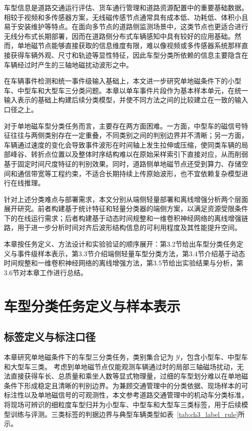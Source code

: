\documentclass{xdupgthesis}
\begin{document}
车型信息是道路交通运行评估、货车通行管理和道路资源配置中的重要基础数据。相较于视频和多传感器方案，无线磁传感节点通常具有成本低、功耗低、体积小且易于安装维护等特点\cite{ch2_sifuentes2011wakeup}。在面向多节点的道路侧监测场景中，这类节点也更适合进行无线分布式长期部署\cite{R09}，因而在道路侧分布式车辆感知中具有较好的应用基础。然而，单地磁节点能够直接获取的信息维度有限，难以像视频或多传感器系统那样直接获得车辆外观、尺寸和轨迹等显性特征，因此车型分类所依赖的信息主要隐含在车辆经过时产生的三轴地磁扰动波形之中。

在车辆事件检测和统一事件级输入基础上，本文进一步研究单地磁条件下的小型车、中型车和大型车三分类问题。本章以单车事件片段作为基本样本单元，在统一输入表示的基础上构建后续分类模型，并使不同方法之间的比较建立在一致的输入口径之上。

对于单地磁车型分类任务而言，主要存在两方面困难。一方面，中型车的磁信号特征往往与两侧类别存在一定重叠，不同类别之间的判别边界并不清晰；另一方面，车辆通过速度的变化会导致事件波形在时间轴上发生拉伸或压缩，使同类车辆的局部峰谷、转折点位置以及整体时序结构难以在原始采样索引下直接对应，从而削弱基于固定时间尺度特征的判别效果。同时，道路侧单地磁节点还受到算力、存储空间和通信带宽等工程约束，不适合长期持续上传原始波形，也不宜依赖复杂模型进行在线推理。

针对上述分类难点与部署需求，本文分别从端侧轻量部署和离线增强分析两个层面展开研究。前者构建基于统计特征和轻量分类器的端侧方案，以满足资源受限条件下的在线运行需求；后者构建基于动态时间规整和一维卷积神经网络的离线增强链路，用于进一步分析时间对齐后波形结构信息的可利用程度及其性能提升空间。

本章按任务定义、方法设计和实验验证的顺序展开：第3.2节给出车型分类任务定义与事件级样本表示，第3.3节介绍端侧轻量车型分类方法，第3.4节介绍基于动态时间规整和一维卷积神经网络的离线增强方法，第3.5节给出实验结果与分析，第3.6节对本章工作进行总结。

\section{车型分类任务定义与样本表示}
\label{sec:ch3_task_data}

\subsection{标签定义与标注口径}
\label{subsec:ch3_data_build}

本章研究单地磁条件下的车型三分类任务，类别集合记为 $\mathcal{Y}$，包含小型车、中型车和大型车三类。
考虑到单地磁节点仅能观测车辆通过时的局部三轴磁场扰动，无法直接获得车长、总质量和乘坐人数等显式物理量，过细的车型划分难以在单地磁条件下形成稳定且清晰的判别边界。为兼顾交通管理中的分类依据、现场样本的可标注性以及单地磁信号的可观测性，本文参考道路交通管理中的机动车分类标准\cite{ch3_mps_ga8022019}，将现场可辨识的细粒度车型归并为小型车、中型车和大型车三类标签，用于后续模型训练与评测。三类标签的判据边界与典型车辆类型如表~\ref{tab:ch3_label_rule}所示。
\end{document}

